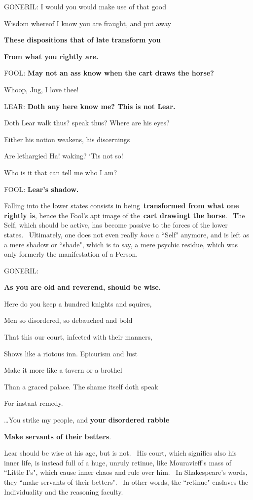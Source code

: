 \begin{quotex}
GONERIL: I would you would make use of that good

Wisdom whereof I know you are fraught, and put away

\textbf{These dispositions that of late transform you}

\textbf{From what you rightly are.}

FOOL: \textbf{May not an ass know when the cart draws the horse?}

Whoop, Jug, I love thee!

LEAR: \textbf{Doth any here know me? This is not Lear.}

Doth Lear walk thus? speak thus? Where are his eyes?

Either his notion weakens, his discernings

Are lethargied Ha! waking? `Tis not so!

Who is it that can tell me who I am?

FOOL: \textbf{Lear's shadow.}

\end{quotex}

Falling into the lower states consists in being \textbf{transformed from what one rightly is}, hence the Fool's apt image of the \textbf{cart drawingt the horse}.  The Self, which should be active, has become passive to the forces of the lower states.  Ultimately, one does not even really \emph{have} a ``Self" anymore, and is left as a mere shadow or ``shade", which is to say, a mere psychic residue, which was only formerly the manifestation of a Person.

\begin{quotex}
GONERIL:

\textbf{As you are old and reverend, should be wise.}

Here do you keep a hundred knights and squires,

Men so disordered, so debauched and bold

That this our court, infected with their manners,

Shows like a riotous inn. Epicurism and lust

Make it more like a tavern or a brothel

Than a graced palace. The shame itself doth speak

For instant remedy.

…You strike my people, and \textbf{your disordered rabble}

\textbf{Make servants of their betters}. 

\end{quotex}
Lear should be wise at his age, but is not.  His court, which signifies also his inner life, is instead full of a huge, unruly retinue, like Mouravieff's mass of ``Little I's", which cause inner chaos and rule over him.  In Shakespeare's words, they ``make servants of their betters".  In other words, the ``retinue" enslaves the Individuality and the reasoning faculty.


